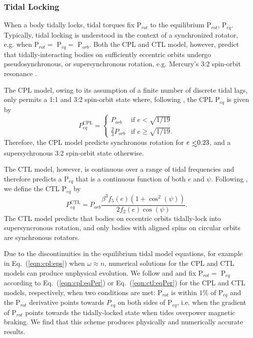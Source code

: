 \documentclass[twocolumn]{aastex61}
\def\lsim{~\rlap{$<$}{\lower 1.0ex\hbox{$\sim$}}}
\begin{document}
\subsubsection{Tidal Locking}

When a body tidally locks, tidal torques fix P$_{rot}$ to the equilibrium P$_{rot}$, P$_{eq}$.  Typically, tidal locking is understood in the context of a synchronized rotator, e.g. when P$_{rot} = $ P$_{eq} = $ P$_{orb}$. Both the CPL and CTL model, however, predict that tidally-interacting bodies on sufficiently eccentric orbits undergo pseudosynchronous, or supersynchronous rotation, e.g. Mercury's 3:2 spin-orbit resonance \citep[P$_{rot} = 2/3$ P$_{orb}$,][]{GoldreichPeale1966}.

The CPL model, owing to its assumption of a finite number of discrete tidal lags, only permits a 1:1 and 3:2 spin-orbit state where, following \citet{Barnes2017}, the CPL P$_{eq}$ is given by
\begin{equation} \label{eqn:cpl:eqPer}
P^{\mathrm{CPL}}_{eq} = 
\begin{cases}
P_{orb} & \text{if } e < \sqrt{1/19}\\
\frac{2}{3}P_{orb} & \text{if } e \geq \sqrt{1/19}.
\end{cases}
\end{equation}
Therefore, the CPL model predicts synchronous rotation for $e \lsim 0.23$, and a supersychronous 3:2 spin-orbit state otherwise.

The CTL model, however, is continuous over a range of tidal frequencies and therefore predicts a P$_{eq}$ that is a continuous function of both $e$ and $\psi$.  Following \citet{Barnes2017}, we define the CTL P$_{eq}$ by
\begin{equation} \label{eqn:ctl:eqPer}
P^{\mathrm{CTL}}_{eq} = P_{orb} \frac{\beta^3 f_5(e) (1 + \cos^2(\psi))}{2f_2(e) \cos(\psi)}.
\end{equation}
The CTL model predicts that bodies on eccentric orbits tidally-lock into supersyncronous rotation, and only bodies with aligned spins on circular orbits are synchronous rotators. 

Due to the discontinuities in the equilibrium tidal model equations, for example in Eq.~(\ref{eqn:cpl:eps}) when $\omega \approx n$, numerical solutions for the CPL and CTL models can produce unphysical evolution. We follow \citet{Barnes2013} and \citet{Fleming2018} and fix P$_{rot} = $ P$_{eq}$ according to Eq.~(\ref{eqn:cpl:eqPer}) or Eq.~(\ref{eqn:ctl:eqPer}) for the CPL and CTL models, respectively, when two conditions are met: P$_{rot}$ is within $1\%$ of P$_{eq}$ and the P$_{rot}$ derivative points towards $P_{eq}$ on both sides of P$_{eq}$, i.e. when the gradient of P$_{rot}$ points towards the tidally-locked state when tides overpower magnetic braking. We find that this scheme produces physically and numerically accurate results. 
\end{document}
